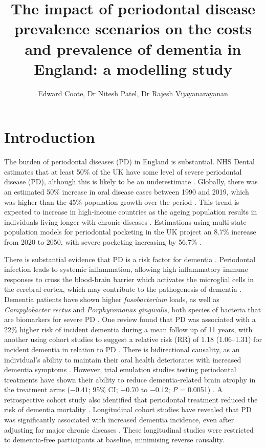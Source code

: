 \documentclass[11pt,a4paper]{article}
\title{\textbf{The impact of periodontal disease prevalence scenarios on the costs and prevalence of dementia in England: a modelling study}}
\author{Edward Coote, Dr Nitesh Patel, Dr Rajesh Vijayanarayanan}
\date{}
\begin{document}
\maketitle

\section{Introduction}

The burden of periodontal diseases (PD) in England is substantial. NHS Dental estimates that at least 50\% of the UK have some level of severe periodontal disease (PD), although this is likely to be an underestimate \cite{ref1}. Globally, there was an estimated 50\% increase in oral disease cases between 1990 and 2019, which was higher than the 45\% population growth over the period \cite{ref2}. This trend is expected to increase in high-income countries as the ageing population results in individuals living longer with chronic diseases \cite{ref3}. Estimations using multi-state population models for periodontal pocketing in the UK project an 8.7\% increase from 2020 to 2050, with severe pocketing increasing by 56.7\% \cite{ref4}.

There is substantial evidence that PD is a risk factor for dementia \cite{ref5,ref6}. Periodontal infection leads to systemic inflammation, allowing high inflammatory immune responses to cross the blood-brain barrier which activates the microglial cells in the cerebral cortex, which may contribute to the pathogenesis of dementia \cite{ref7,ref8}. Dementia patients have shown higher \textit{fusobacterium} loads, as well as \textit{Campylobacter rectus} and \textit{Porphyromonas gingivalis}, both species of bacteria that are biomarkers for severe PD \cite{ref9}. One review found that PD was associated with a 22\% higher risk of incident dementia during a mean follow up of 11 years, with another using cohort studies to suggest a relative risk (RR) of 1.18 (1.06--1.31) for incident dementia in relation to PD \cite{ref6,ref10}. There is bidirectional causality, as an individual's ability to maintain their oral health deteriorates with increased dementia symptoms \cite{ref11}. However, trial emulation studies testing periodontal treatments have shown their ability to reduce dementia-related brain atrophy in the treatment arms ($-0.41$; 95\% CI; $-0.70$ to $-0.12$; \textit{P} = 0.0051) \cite{ref12}. A retrospective cohort study also identified that periodontal treatment reduced the risk of dementia mortality \cite{ref13}. Longitudinal cohort studies have revealed that PD was significantly associated with increased dementia incidence, even after adjusting for major chronic diseases \cite{ref14,ref15,ref16}. These longitudinal studies were restricted to dementia-free participants at baseline, minimising reverse causality.
\end{document}
